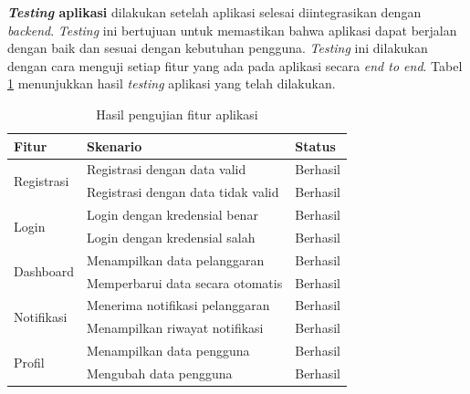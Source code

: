 \textbf{\emph{Testing} aplikasi} dilakukan setelah aplikasi selesai diintegrasikan dengan \emph{backend}. \emph{Testing} ini bertujuan untuk memastikan bahwa aplikasi dapat berjalan dengan baik dan sesuai dengan kebutuhan pengguna. \emph{Testing} ini dilakukan dengan cara menguji setiap fitur yang ada pada aplikasi secara \emph{end to end}. Tabel \ref{tab:testingapp} menunjukkan hasil \emph{testing} aplikasi yang telah dilakukan.

\begin{table}[htbp]
  \centering
  \caption{Hasil pengujian fitur aplikasi}
  \label{tab:testingapp}
  \begin{tabular}{|l|l|l|}
  \hline
  \textbf{Fitur} & \textbf{Skenario} & \textbf{Status} \\
  \hline
  \multirow{2}{*}{Registrasi} & Registrasi dengan data valid & Berhasil \\
  \cline{2-3}
  & Registrasi dengan data tidak valid & Berhasil \\
  \hline
  \multirow{2}{*}{Login} & Login dengan kredensial benar & Berhasil \\
  \cline{2-3}
  & Login dengan kredensial salah & Berhasil \\
  \hline
  \multirow{2}{*}{Dashboard} & Menampilkan data pelanggaran & Berhasil \\
  \cline{2-3}
  & Memperbarui data secara otomatis & Berhasil \\
  \hline
  \multirow{2}{*}{Notifikasi} & Menerima notifikasi pelanggaran & Berhasil \\
  \cline{2-3}
  & Menampilkan riwayat notifikasi & Berhasil \\
  \hline
  \multirow{2}{*}{Profil} & Menampilkan data pengguna & Berhasil \\
  \cline{2-3}
  & Mengubah data pengguna & Berhasil \\
  \hline
  \end{tabular}
\end{table}